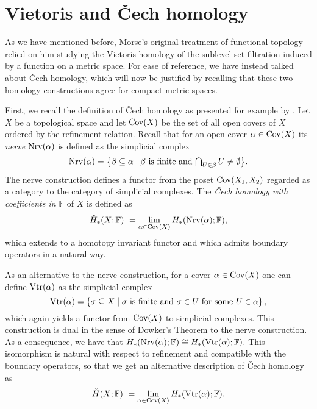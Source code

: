 
\section{Vietoris and \v{C}ech homology} \label{s:vietoris}

As we have mentioned before, Morse's original treatment of functional topology relied on him studying the Vietoris homology \cite{MR1512371} of the sublevel set filtration induced by a function on a metric space. 
For ease of reference, we have instead talked about \v{C}ech homology, which will now be justified by recalling that these two homology constructions agree for compact metric spaces.

First, we recall the definition of \v{C}ech homology as presented for example by \citet[Section IX--X]{MR0050886}.
Let $X$ be a topological space and let $\operatorname{Cov}(X)$ be the set of all open covers of $X$ ordered by the refinement relation. 
Recall that for an open cover $\alpha \in \operatorname{Cov}(X)$ its \emph{nerve} $\operatorname{Nrv}(\alpha)$ is defined as the simplicial complex
\[
\operatorname{Nrv}(\alpha) =
\big\{ \beta \subseteq \alpha \mid \beta \text{ is finite and } \textstyle{\bigcap_{U \in \beta}} \, U \neq \emptyset \big\}.
\]
The nerve construction defines a functor from the poset $\operatorname{Cov}(X_{1},X_{2})$ regarded as a category to the category of simplicial complexes. 
The \emph{\v{C}ech homology with coefficients in $\mathbb{F}$} of $X$ is defined as
\[
\check{H}_{*}(X; \mathbb{F}) \ =
\lim_{\alpha \in \operatorname{Cov}(X)} H_{*}(\operatorname{Nrv}(\alpha); \mathbb{F}),
\]
which extends to a homotopy invariant functor and which admits boundary operators in a natural way.

As an alternative to the nerve construction, for a cover $\alpha \in \operatorname{Cov}(X)$ one can define $\operatorname{Vtr}(\alpha)$ as the simplicial complex
\[
\operatorname{Vtr} (\alpha) = \left\{ \sigma \subseteq X \mid \sigma \text{ is finite and } \sigma \in U \text{ for some } U \in \alpha  \right\},
\]
which again yields a functor from $\operatorname{Cov}(X)$ to simplicial complexes.
This construction is dual in the sense of Dowker's Theorem \cite{Dowker.1952} to the nerve construction.
As a consequence, we have that
$
H_{*} (\operatorname{Nrv} (\alpha); \mathbb{F}) \cong H_{*} (\operatorname{Vtr} (\alpha); \mathbb{F}).
$
This isomorphism is natural with respect to refinement and compatible with the boundary operators, so that we get an alternative description of \v{C}ech homology as 
\[
\check{H} (X; \mathbb{F}) \ =
\lim_{\alpha \in \operatorname{Cov} (X)} H_{*} (\operatorname{Vtr} (\alpha); \mathbb{F}).
\]

